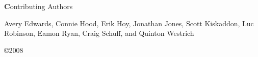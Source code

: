 
\onecolumn

\begin{changemargin}{2cm}{2cm}

\begin{center}
\begin{Large}
{\textbf Contributing Authors}
\end{Large}
\end{center}

\vspace{0.5cm}

Avery Edwards,
Connie Hood,
Erik Hoy,
Jonathan Jones,
Scott Kiskaddon,
Luc Robinson,
Eamon Ryan,
Craig Schuff,
and
Quinton Westrich

\vfill

\begin{center}
\copyright 2008
\end{center}

\end{changemargin}

\twocolumn

